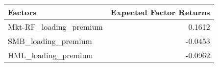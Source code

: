 \begin{tabular}{lr}
\toprule
Factors & Expected Factor Returns \\
\midrule
Mkt-RF\_loading\_premium & 0.1612 \\
SMB\_loading\_premium & -0.0453 \\
HML\_loading\_premium & -0.0962 \\
\bottomrule
\end{tabular}

